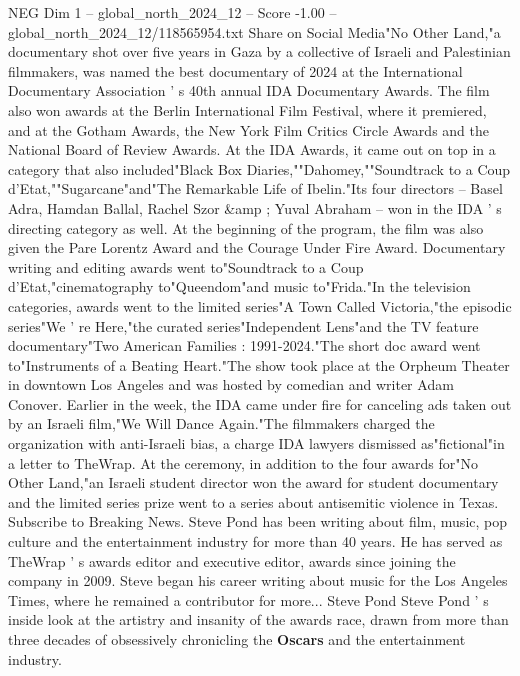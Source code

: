 \begin{textsample}{NEG Dim 1 – global\_north\_2024\_12 – Score -1.00 – global\_north\_2024\_12/118565954.txt}  \label{ex:f1_neg_188}
Share on Social Media"No Other Land,"a documentary shot over five years in Gaza by a collective of Israeli and Palestinian filmmakers, was named the best documentary of 2024 at the International Documentary Association ' s 40th annual IDA Documentary Awards.
The film also won awards at the Berlin International Film Festival, where it premiered, and at the Gotham Awards, the New York Film Critics Circle Awards and the National Board of Review Awards.
At the IDA Awards, it came out on top in a category that also included"Black Box Diaries,""Dahomey,""Soundtrack to a Coup d'Etat,""Sugarcane"and"The Remarkable Life of Ibelin."Its four directors -- Basel Adra, Hamdan Ballal, Rachel Szor \&amp ; Yuval Abraham -- won in the IDA ' s directing category as well.
At the beginning of the program, the film was also given the Pare Lorentz Award and the Courage Under Fire Award.
Documentary writing and editing awards went to"Soundtrack to a Coup d'Etat,"cinematography to"Queendom"and music to"Frida."In the television categories, awards went to the limited series"A Town Called Victoria,"the episodic series"We ' re Here,"the curated series"Independent Lens"and the TV feature documentary"Two American Families : 1991-2024."The short doc award went to"Instruments of a Beating Heart."The show took place at the Orpheum Theater in downtown Los Angeles and was hosted by comedian and writer Adam Conover.
Earlier in the week, the IDA came under fire for canceling ads taken out by an Israeli film,"We Will Dance Again."The filmmakers charged the organization with anti-Israeli bias, a charge IDA lawyers dismissed as"fictional"in a letter to TheWrap.
At the ceremony, in addition to the four awards for"No Other Land,"an Israeli student director won the award for student documentary and the limited series prize went to a series about antisemitic violence in Texas.
Subscribe to Breaking News.
Steve Pond has been writing about film, music, pop culture and the entertainment industry for more than 40 years.
He has served as TheWrap ' s awards editor and executive editor, awards since joining the company in 2009.
Steve began his career writing about music for the Los Angeles Times, where he remained a contributor for more...
Steve Pond Steve Pond ' s inside look at the artistry and insanity of the awards race, drawn from more than three decades of obsessively chronicling the \textbf{Oscars} and the entertainment industry.

\end{textsample}
